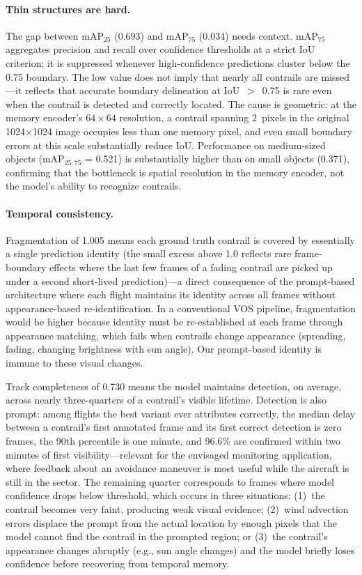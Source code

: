 \documentclass[1p,11pt]{elsarticle}
\begin{document}
\paragraph{Thin structures are hard.} The gap between mAP$_{25}$ (0.693) and mAP$_{75}$ (0.034) needs context. mAP$_{75}$ aggregates precision and recall over confidence thresholds at a strict IoU criterion; it is suppressed whenever high-confidence predictions cluster below the 0.75 boundary. The low value does not imply that nearly all contrails are missed---it reflects that accurate boundary delineation at IoU~$>$~0.75 is rare even when the contrail is detected and correctly located. The cause is geometric: at the memory encoder's $64\times64$ resolution, a contrail spanning 2~pixels in the original 1024$\times$1024 image occupies less than one memory pixel, and even small boundary errors at this scale substantially reduce IoU. Performance on medium-sized objects (mAP$_{25{:}75}$ = 0.521) is substantially higher than on small objects (0.371), confirming that the bottleneck is spatial resolution in the memory encoder, not the model's ability to recognize contrails.

\paragraph{Temporal consistency.} Fragmentation of 1.005 means each ground truth contrail is covered by essentially a single prediction identity (the small excess above 1.0 reflects rare frame-boundary effects where the last few frames of a fading contrail are picked up under a second short-lived prediction)---a direct consequence of the prompt-based architecture where each flight maintains its identity across all frames without appearance-based re-identification. In a conventional VOS pipeline, fragmentation would be higher because identity must be re-established at each frame through appearance matching, which fails when contrails change appearance (spreading, fading, changing brightness with sun angle). Our prompt-based identity is immune to these visual changes.

Track completeness of 0.730 means the model maintains detection, on average, across nearly three-quarters of a contrail's visible lifetime. Detection is also prompt: among flights the best variant ever attributes correctly, the median delay between a contrail's first annotated frame and its first correct detection is zero frames, the 90th percentile is one minute, and 96.6\% are confirmed within two minutes of first visibility---relevant for the envisaged monitoring application, where feedback about an avoidance maneuver is most useful while the aircraft is still in the sector. The remaining quarter corresponds to frames where model confidence drops below threshold, which occurs in three situations: (1)~the contrail becomes very faint, producing weak visual evidence; (2)~wind advection errors displace the prompt from the actual location by enough pixels that the model cannot find the contrail in the prompted region; or (3)~the contrail's appearance changes abruptly (e.g., sun angle changes) and the model briefly loses confidence before recovering from temporal memory.
\end{document}
